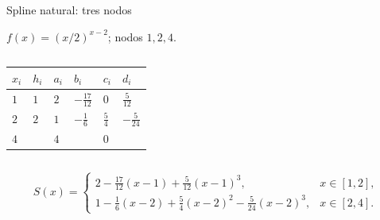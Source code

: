 \documentclass[original_version/main.tex]{subfiles}
\begin{document}
\begin{frame}[t]{Spline natural: tres nodos}
\par\noindent\begin{minipage}[t][9mm][t]{\textwidth}\small\strut $f(x)=(x/2)^{x-2}$; nodos $1,2,4$.\end{minipage}\par\nointerlineskip
\begin{columns}[T]\begin{minipage}[t]{\textwidth}\begingroup\scriptsize\setlength{\tabcolsep}{2pt}\begin{center}\begin{tabular}{|C{.12\textwidth}|C{.12\textwidth}|C{.12\textwidth}|C{.12\textwidth}|C{.12\textwidth}|C{.12\textwidth}|}\hline
\rule[-2mm]{0pt}{6mm}$x_i$&$h_i$&$a_i$&$b_i$&$c_i$&$d_i$\\\hline
\rule[-2.5mm]{0pt}{7mm}$1$&$1$&$2$&$-\frac{17}{12}$&$0$&$\frac{5}{12}$\\\hline
\rule[-2.5mm]{0pt}{7mm}$2$&$2$&$1$&$-\frac{1}{6}$&$\frac{5}{4}$&$-\frac{5}{24}$\\\hline
\rule[-2.5mm]{0pt}{7mm}$4$&&$4$&&$0$&\\\hline
\end{tabular}\end{center}\endgroup\end{minipage}\par
\end{columns}\small
\[S(x)=\begin{cases}
2-\frac{17}{12}(x-1)+\frac5{12}(x-1)^3,&x\in[1,2],\\[2mm]
1-\frac16(x-2)+\frac54(x-2)^2-\frac5{24}(x-2)^3,&x\in[2,4].
\end{cases}\]
\end{frame}
\end{document}
